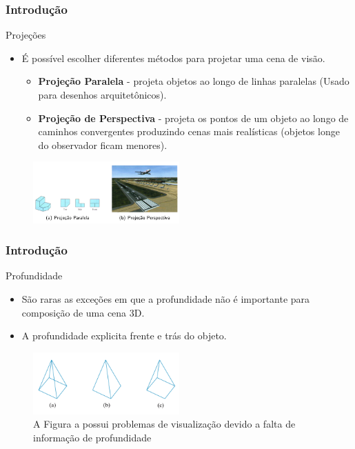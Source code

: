 \documentclass{beamer}
\begin{document}
\begin{frame}
\frametitle{Introdução}


	\begin{block}{Projeções}
		\begin{itemize}
			\item É possível escolher diferentes métodos para projetar uma cena de visão.
			\begin{itemize}
				\item \textbf{Projeção Paralela} - projeta objetos ao longo de linhas paralelas (Usado para desenhos arquitetônicos).
				\item \textbf{Projeção de Perspectiva} - projeta os pontos de um objeto ao longo de caminhos convergentes produzindo cenas mais realísticas (objetos longe do observador ficam menores).
			\end{itemize}
		\end{itemize}
	\end{block}
	
	\begin{figure}[!h]
			\begin{center}
			\includegraphics[width=0.5\textwidth]{Figures/Pro}
			\end{center}
	\end{figure}	
\end{frame}

\begin{frame}
\frametitle{Introdução}


	\begin{block}{Profundidade}
		\begin{itemize}
			\item São raras as exceções em que a profundidade não é importante para composição de uma cena 3D.
			\item A profundidade explicita frente e trás do objeto.
		\end{itemize}
	\end{block}
	
	\begin{figure}[!h]
			\begin{center}
			\includegraphics[width=0.5\textwidth]{Figures/ProObj}
			\caption{A Figura a possui problemas de visualização devido a falta de informação de profundidade}
			\end{center}
	\end{figure}	
\end{frame}
\end{document}
